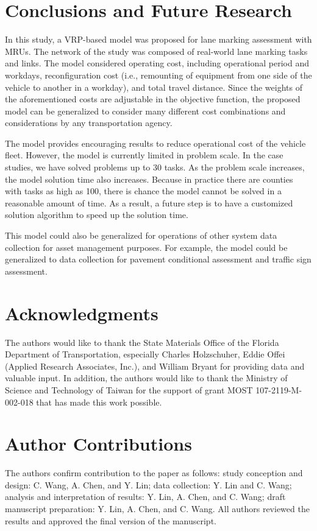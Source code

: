 \documentclass[numbered]{trbunofficial}
\begin{document}
\section{Conclusions and Future Research}
In this study, a VRP-based model was proposed for lane marking assessment with MRUs. The network of the study was composed of real-world lane marking tasks and links. The model considered operating cost, including operational period and workdays, reconfiguration cost (i.e., remounting of equipment from one side of the vehicle to another in a workday), and total travel distance. Since the weights of the aforementioned costs are adjustable in the objective function, the proposed model can be generalized to consider many different cost combinations and considerations by any transportation agency. 

The model provides encouraging results to reduce operational cost of the vehicle fleet. However, the model is currently limited in problem scale. In the case studies, we have solved problems up to 30 tasks. As the problem scale increases, the model solution time also increases. Because in practice there are counties with tasks as high as 100, there is chance the model cannot be solved in a reasonable amount of time. As a result, a future step is to have a customized solution algorithm to speed up the solution time. 

This model could also be generalized for operations of other system data collection for asset management purposes. For example, the model could be generalized to data collection for pavement conditional assessment and traffic sign assessment. 

\section{Acknowledgments}
The authors would like to thank the State Materials Office of the Florida Department of Transportation, especially Charles Holzschuher, Eddie Offei (Applied Research Associates, Inc.), and William Bryant for providing data and valuable input. In addition, the authors would like to thank the Ministry of Science and Technology of Taiwan for the support of grant MOST 107-2119-M-002-018 that has made this work possible.

\section{Author Contributions}
The authors confirm contribution to the paper as follows: study conception and design: C. Wang, A. Chen, and Y. Lin; data collection: Y. Lin and C. Wang; analysis and interpretation of results: Y. Lin, A. Chen, and C. Wang; draft manuscript preparation: Y. Lin, A. Chen, and C. Wang. All authors reviewed the results and approved the final version of the manuscript.

\newpage



\end{document}
